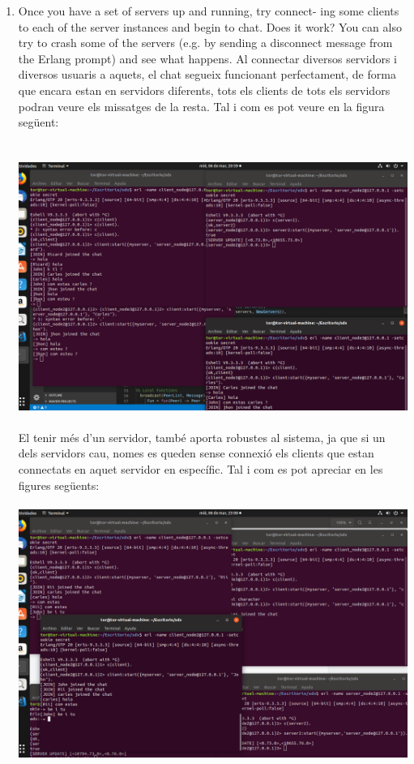 \documentclass[a4paper, 10pt]{article}
\begin{document}
\begin{enumerate}
  \newpage\item Once you have a set of servers up and running, try connect- ing some clients to each of the server instances and begin to chat. Does it work? You can also try to crash some of the servers (e.g. by sending a disconnect message from the Erlang prompt) and see what happens.
  Al connectar diversos servidors i diversos usuaris a aquets, el chat segueix funcionant perfectament, de forma que encara estan en servidors diferents, tots els clients de tots els servidors podran veure els missatges de la resta. Tal i com es pot veure en la figura següent:\\\\\\
  \includegraphics[width=\textwidth]{img2s}\\\\
 \newpage El tenir més d'un servidor, també aporta robustes al sistema, ja que si un dels servidors cau, nomes es queden sense connexió els clients que estan connectats en aquet servidor en específic. Tal i com es pot apreciar en les figures següents:\\\\
  \includegraphics[width=\textwidth]{img3}\\\\

\end{enumerate}
\end{document}
